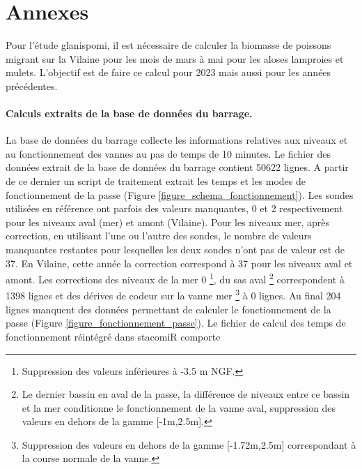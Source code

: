 \documentclass[11pt,twocolumn,titlepage,twoside]{article}\usepackage[]{graphicx}\usepackage[]{color}
\begin{document}
\clearpage
\onecolumn
\section{Annexes}

Pour l'étude glanispomi, il est nécessaire de calculer la biomasse de poissons
migrant sur la Vilaine pour les mois de mars à mai pour les aloses lamproies et
mulets. L'objectif est de faire ce calcul pour 2023 mais aussi pour les années
précédentes.




\paragraph{Calculs extraits de la base de données du barrage.}

La base de données du barrage collecte les informations relatives aux niveaux et
au fonctionnement des vannes au pas de temps de 10 minutes. Le fichier des données extrait de la base de données du barrage
contient \textcolor{orange_EV}{\num{50622}} lignes. A partir de ce dernier un
script de traitement extrait les temps et les modes de fonctionnement de la
passe (Figure \ref{figure_schema_fonctionnement}). 
Les sondes utilisées en
référence ont parfois des valeurs manquantes,
 \textcolor{orange_EV}{\num{0}} et \textcolor{orange_EV}{\num{2}} respectivement 
 pour les niveaux aval (mer) et amont (Vilaine).
Pour les niveaux mer, après correction, en utilisant l'une ou l'autre des
sondes, le nombre de valeurs manquantes restantes pour lesquelles les deux sondes n'ont pas de
valeur est de \textcolor{orange_EV}{\num{37}}. En Vilaine,
cette année la correction correspond à
\textcolor{orange_EV}{\num{37}} pour les niveaux aval et amont.
Les corrections des niveaux de la mer
\textcolor{orange_EV}{\num{0}} \footnote{Suppression des valeurs
inférieures à -3.5 m NGF.}, du sas aval \footnote{Le dernier bassin en aval de
la passe, la différence de niveaux entre ce bassin et la mer conditionne le
fonctionnement de la vanne aval, suppression des valeurs en dehors de la gamme
[-1m,2.5m].} correspondent à \textcolor{orange_EV}{\num{1398}} lignes et des
dérives de codeur sur la vanne mer \footnote{Suppression des valeurs en dehors de la gamme
[-1.72m,2.5m] correspondant à la course normale de la vanne.} à
\textcolor{orange_EV}{\num{0}} lignes. 
Au final \textcolor{orange_EV}{\num{204}} lignes manquent des données permettant de
calculer le fonctionnement de la passe (Figure \ref{figure_fonctionnement_passe}). Le fichier de calcul des temps de
fonctionnement réintégré dans stacomiR comporte
\end{document}
